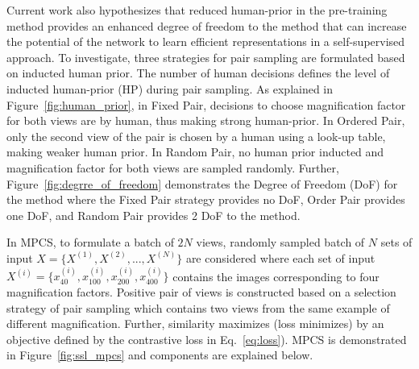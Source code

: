 \documentclass[conference]{IEEEtran}
\begin{document}
Current work also hypothesizes that reduced human-prior in the pre-training method provides an enhanced degree of freedom to the method that can increase the potential of the network to learn efficient representations in a self-supervised approach. To investigate, three strategies for pair sampling are formulated based on inducted human prior. The number of human decisions defines the level of inducted human-prior (HP) during pair sampling. As explained in Figure~\ref{fig:human_prior}, in Fixed Pair, decisions to choose magnification factor for both views are by human, thus making strong human-prior. In Ordered Pair, only the second view of the pair is chosen by a human using a look-up table, making weaker human prior. In Random Pair, no human prior inducted and magnification factor for both views are sampled randomly. Further, Figure~\ref{fig:degrre_of_freedom} demonstrates the Degree of Freedom (DoF) for the method where the Fixed Pair strategy provides no DoF, Order Pair provides one DoF, and Random Pair provides 2 DoF to the method. 






In MPCS, to formulate a batch of $2N$ views, randomly sampled batch of $N$ sets of input $X=\{X^{(1)}, X^{(2)}, ..., X^{(N)}\}$ are considered where each set of input $X^{(i)}=\{x^{(i)}_{40}, x^{(i)}_{100}, x^{(i)}_{200}, x^{(i)}_{400}\}$ contains the images corresponding to four magnification factors.
Positive pair of views is constructed based on a selection strategy of pair sampling which contains two views from the same example of different magnification. Further, similarity maximizes (loss minimizes) by an objective defined by the contrastive loss in Eq.~\ref{eq:loss}). MPCS is demonstrated in Figure~\ref{fig:ssl_mpcs} and components are explained below.
\end{document}
